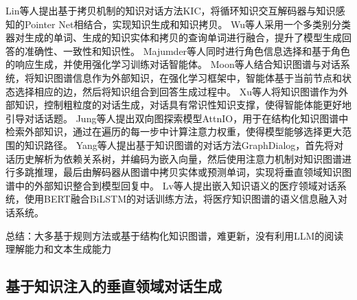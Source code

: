 Lin等人\cite{DBLP:conf/acl/LinJHWC20}提出基于拷贝机制的知识对话方法KIC，将循环知识交互解码器与知识感知的Pointer Net相结合，实现知识生成和知识拷贝。
Wu等人\cite{DBLP:conf/acl/WuLZZW20}采用一个多类别分类器对生成的单词、生成的知识实体和拷贝的查询单词进行融合，提升了模型生成回答的准确性、一致性和知识性。
Majumder等人\cite{DBLP:conf/emnlp/MajumderJBM20}同时进行角色信息选择和基于角色的响应生成，并使用强化学习训练对话智能体。
Moon等人\cite{DBLP:conf/acl/MoonSKS19}结合知识图谱与对话系统，将知识图谱信息作为外部知识，在强化学习框架中，智能体基于当前节点和状态选择相应的边，然后将知识组合到回答生成过程中。
Xu等人\cite{DBLP:conf/acl/XuWNWCL20}将知识图谱作为外部知识，控制粗粒度的对话生成，对话具有常识性知识支撑，使得智能体能更好地引导对话话题。
Jung等人\cite{DBLP:conf/emnlp/JungSL20}提出双向图探索模型AttnIO，用于在结构化知识图谱中检索外部知识，通过在遍历的每一步中计算注意力权重，使得模型能够选择更大范围的知识路径。
Yang等人\cite{DBLP:conf/emnlp/YangZE20}提出基于知识图谱的对话方法GraphDialog，首先将对话历史解析为依赖关系树，并编码为嵌入向量，然后使用注意力机制对知识图谱进行多跳推理，最后由解码器从图谱中拷贝实体或预测单词，实现将垂直领域知识图谱中的外部知识整合到模型回复中。
Lv等人\cite{SJSJ202312037}提出嵌入知识语义的医疗领域对话系统，使用BERT融合BiLSTM的对话训练方法，将医疗知识图谱的语义信息融入对话系统。

总结：大多基于规则方法或基于结构化知识图谱，难更新，没有利用LLM的阅读理解能力和文本生成能力

\subsection{基于知识注入的垂直领域对话生成}

